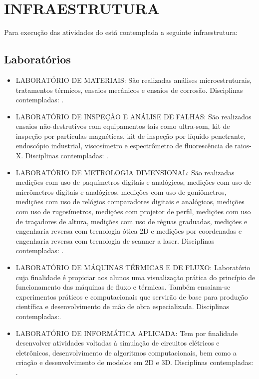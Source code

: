 \section{INFRAESTRUTURA}
\label{INFRA}
Para execução das atividades do \NOMECURSO está contemplada a seguinte infraestrutura:

\subsection{Laboratórios}

\begin{itemize}%
	\item [LMAT] LABORATÓRIO DE MATERIAIS: São realizadas análises microestruturais, tratamentos térmicos, ensaios mecânicos e ensaios de
	corrosão. Disciplinas contempladas: \LMATdisc.
	
	\item [LIAF] LABORATÓRIO DE INSPEÇÃO E ANÁLISE DE FALHAS: São realizados ensaios não-destrutivos com equipamentos tais como
	ultra-som, kit de inspeção por partículas magnéticas, kit de inspeção por líquido penetrante, endoscópio industrial,
	viscosímetro e espectrômetro de fluorescência de raios-X. Disciplinas contempladas: \LIAFdisc.
	
	\item [LMET] LABORATÓRIO DE METROLOGIA DIMENSIONAL: São realizadas medições com uso de paquímetros digitais e analógicos, medições
	com uso de micrômetros digitais e analógicos, medições com uso de goniômetros, medições com uso de relógios
	comparadores digitais e analógicos, medições com uso de rugosímetros, medições com projetor de perfil, medições com uso
	de traçadores de altura, medições com uso de réguas graduadas, medições e engenharia reversa com tecnologia ótica 2D e
	medições por coordenadas e engenharia reversa com tecnologia de scanner a laser.  Disciplinas contempladas: \LMETdisc.
	
	\item [LTF] LABORATÓRIO DE MÁQUINAS TÉRMICAS E DE FLUXO: Laboratório cuja finalidade é propiciar aos alunos uma visualização prática
	do princípio de funcionamento das máquinas de fluxo e térmicas. Também ensaiam-se experimentos práticos e
	computacionais que servirão de base para produção científica e desenvolvimento de mão de obra especializada. Disciplinas contempladas:\LTFdisc.
	
	\item [LIA] LABORATÓRIO DE INFORMÁTICA APLICADA: Tem por finalidade desenvolver atividades voltadas à simulação de circuitos
	elétricos e eletrônicos, desenvolvimento de algoritmos computacionais, bem como a criação e desenvolvimento de modelos
	em 2D e 3D. Disciplinas contempladas: \LIAdisc.
	

\end{itemize}
